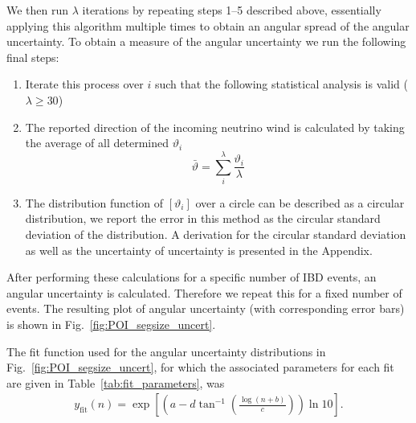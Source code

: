 \documentclass[tightenlines,
twocolumn,prl,notitlepage,nofootinbib,preprintnumbers,longbibliography]{revtex4-1}
\begin{document}
We then run $\lambda$ iterations by repeating steps 1--5 described above, essentially applying this algorithm multiple times to obtain an angular spread of the angular uncertainty. To obtain a measure of the angular uncertainty we run the following final steps:
%
\begin{enumerate}

    \item Iterate this process over $i$ such that the following statistical analysis is valid ($\lambda \geq 30$)
    \item The reported direction of the incoming neutrino wind is calculated by taking the average of all determined $\vartheta_i$
\[\bar\vartheta=\sum^\lambda_i\frac{\vartheta_i}{\lambda} \]
    
    \item The distribution function of $[\vartheta_i]$ over a circle can be described as a circular distribution, we report the error in this method as the circular standard deviation of the distribution. A derivation for the circular standard deviation as well as the uncertainty of uncertainty is presented in the Appendix.
\end{enumerate}

After performing these calculations for a specific number of IBD events, an angular uncertainty is calculated. Therefore we repeat this for a fixed number of events. The resulting plot of angular uncertainty (with corresponding error bars) is shown in Fig.~\ref{fig:POI_segsize_uncert}.

The fit function used for the angular uncertainty distributions in Fig.~\ref{fig:POI_segsize_uncert}, for which the associated parameters for each fit are given in Table~\ref{tab:fit_parameters}, was
%
\begin{align}
y_\mathrm{fit}(n)=\exp\left[\left(a-d\tan^{-1}{\left(\frac{\log{(n+b)}}{c}\right)}\right)\ln 10\right].
\end{align}
\end{document}
